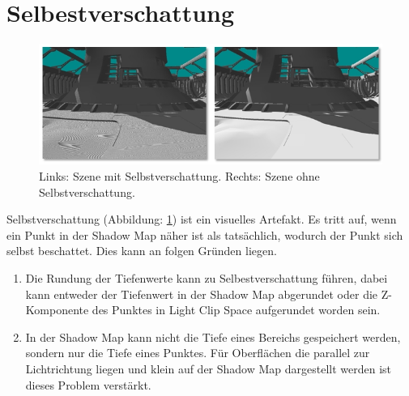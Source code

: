 \section{Selbestverschattung}
\label{section:self-shadow}
\begin{figure}[H]
	\begin{center}
    \includegraphics[width=1\textwidth]{res/img/shadow-acne1/image.jpg}
    \caption{Links\hspace{6pt}: Szene mit Selbstverschattung. 
         \newline Rechts: Szene ohne Selbstverschattung.} 
	  \label{fig:shadow-acne-artefact}
	\end{center}
\end{figure}
Selbstverschattung (Abbildung: \ref{fig:shadow-acne-artefact}) ist ein visuelles Artefakt.
Es tritt auf, wenn ein Punkt in der Shadow Map näher ist als tatsächlich, wodurch der Punkt sich selbst beschattet.
Dies kann an folgen Gründen liegen.
\begin{enumerate}
  \item Die Rundung der Tiefenwerte kann zu Selbestverschattung führen, dabei kann entweder der Tiefenwert in der Shadow Map
    abgerundet oder die Z-Komponente des Punktes in Light Clip Space aufgerundet worden sein.
  \item In der Shadow Map kann nicht die Tiefe eines Bereichs
    gespeichert werden, sondern nur die Tiefe eines Punktes.
    Für Oberflächen die parallel zur Lichtrichtung liegen und klein auf der Shadow Map dargestellt werden ist dieses Problem
    verstärkt.
\end{enumerate}


